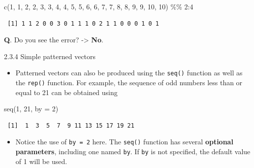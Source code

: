 \documentclass[
  9pt,
  a4paper,
  ignorenonframetext,
  notheorems]{beamer}
\newenvironment{Shaded}{\begin{snugshade}}{\end{snugshade}}
\newcommand{\AttributeTok}[1]{\textcolor[rgb]{0.40,0.45,0.13}{#1}}
\newcommand{\DecValTok}[1]{\textcolor[rgb]{0.68,0.00,0.00}{#1}}
\newcommand{\FunctionTok}[1]{\textcolor[rgb]{0.28,0.35,0.67}{#1}}
\newcommand{\NormalTok}[1]{\textcolor[rgb]{0.00,0.23,0.31}{#1}}
\newcommand{\SpecialCharTok}[1]{\textcolor[rgb]{0.37,0.37,0.37}{#1}}
\providecommand{\tightlist}{%
  \setlength{\itemsep}{0pt}\setlength{\parskip}{0pt}}\usepackage{longtable,booktabs,array}
\begin{document}
\begin{frame}[fragile]
\begin{Shaded}
\begin{Highlighting}[]
\FunctionTok{c}\NormalTok{(}\DecValTok{1}\NormalTok{, }\DecValTok{1}\NormalTok{, }\DecValTok{2}\NormalTok{, }\DecValTok{2}\NormalTok{, }\DecValTok{3}\NormalTok{, }\DecValTok{3}\NormalTok{, }\DecValTok{4}\NormalTok{, }\DecValTok{4}\NormalTok{, }\DecValTok{5}\NormalTok{, }\DecValTok{5}\NormalTok{, }\DecValTok{6}\NormalTok{, }\DecValTok{6}\NormalTok{, }\DecValTok{7}\NormalTok{, }\DecValTok{7}\NormalTok{, }\DecValTok{8}\NormalTok{, }\DecValTok{8}\NormalTok{, }\DecValTok{9}\NormalTok{, }\DecValTok{9}\NormalTok{, }\DecValTok{10}\NormalTok{, }\DecValTok{10}\NormalTok{) }\SpecialCharTok{\%\%} \DecValTok{2}\SpecialCharTok{:}\DecValTok{4}
\end{Highlighting}
\end{Shaded}

\begin{verbatim}
 [1] 1 1 2 0 0 3 0 1 1 1 0 2 1 1 0 0 0 1 0 1
\end{verbatim}

\textbf{Q}. Do you see the error? -\textgreater{} \textbf{No}.
\end{frame}

\begin{frame}[fragile]{2.3.4 Simple patterned vectors}
\protect\hypertarget{simple-patterned-vectors}{}
\begin{itemize}
\tightlist
\item
  Patterned vectors can also be produced using the \texttt{seq()}
  function as well as the \texttt{rep()} function. For example, the
  sequence of odd numbers less than or equal to 21 can be obtained using
\end{itemize}

\begin{Shaded}
\begin{Highlighting}[]
\FunctionTok{seq}\NormalTok{(}\DecValTok{1}\NormalTok{, }\DecValTok{21}\NormalTok{, }\AttributeTok{by =} \DecValTok{2}\NormalTok{)}
\end{Highlighting}
\end{Shaded}

\begin{verbatim}
 [1]  1  3  5  7  9 11 13 15 17 19 21
\end{verbatim}

\begin{itemize}
\tightlist
\item
  Notice the use of \texttt{by\ =\ 2} here. The \texttt{seq()} function
  has several \textbf{optional parameters}, including one named
  \texttt{by}. If \texttt{by} is not specified, the default value of 1
  will be used.
\end{itemize}
\end{frame}
\end{document}
